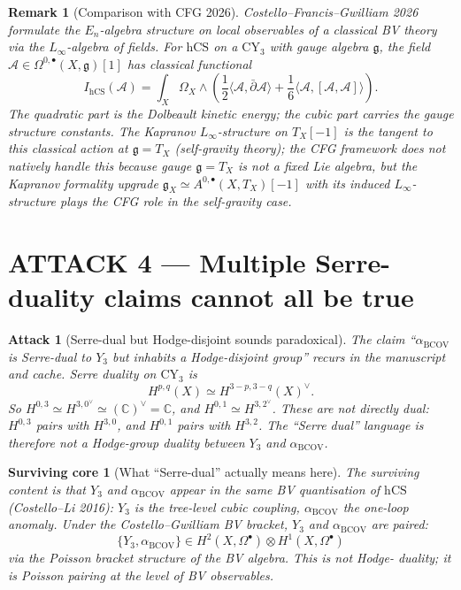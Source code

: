 \documentclass[11pt]{article}
\newtheorem{remark}[theorem]{Remark}
\newtheorem{attack}[theorem]{Attack}
\newtheorem{surviving}[theorem]{Surviving core}
\providecommand{\CY}{\mathrm{CY}}
\providecommand{\BCOV}{\mathrm{BCOV}}
\providecommand{\hCS}{\mathrm{hCS}}
\providecommand{\Om}{\Omega}
\providecommand{\cA}{\mathcal{A}}
\providecommand{\fg}{\mathfrak{g}}
\providecommand{\CC}{\mathbb{C}}
\begin{document}
\begin{remark}[Comparison with CFG 2026]
\label{rem:cfg-comparison-3}
Costello--Francis--Gwilliam 2026 formulate the $E_n$-algebra structure
on local observables of a classical BV theory via the $L_\infty$-algebra
of fields. For $\hCS$ on a $\CY_3$ with gauge algebra $\fg$, the field
$\mathcal A \in \Om^{0,\bullet}(X, \fg)[1]$ has classical functional
\[
  I_\hCS(\cA) = \int_X \Om_X \wedge \left(\frac{1}{2} \langle \cA,
    \bar\partial \cA \rangle + \frac{1}{6} \langle \cA, [\cA, \cA]
    \rangle\right).
\]
The quadratic part is the Dolbeault kinetic energy; the cubic part
carries the gauge structure constants. The Kapranov $L_\infty$-structure
on $T_X[-1]$ is the \emph{tangent} to this classical action at $\fg =
T_X$ (self-gravity theory); the CFG framework does not natively handle
this because gauge $\fg = T_X$ is not a fixed Lie algebra, but the
Kapranov formality upgrade $\mathfrak g_X \simeq A^{0,\bullet}(X, T_X)[-1]$
with its induced $L_\infty$-structure plays the CFG role in the
self-gravity case.
\end{remark}

\section{ATTACK 4 --- Multiple Serre-duality claims cannot all be true}
\label{sec:attack-4}

\begin{attack}[Serre-dual but Hodge-disjoint sounds paradoxical]
\label{atk:4}
The claim ``$\alpha_\BCOV$ is Serre-dual to $Y_3$ but inhabits a
Hodge-disjoint group'' recurs in the manuscript and cache. Serre duality
on $\CY_3$ is
\[
  H^{p,q}(X) \simeq H^{3-p, 3-q}(X)^\vee.
\]
So $H^{0,3} \simeq H^{3,0 }^\vee \simeq (\CC)^\vee = \CC$, and $H^{0,1}
\simeq H^{3,2}^\vee$. These are \emph{not} directly dual: $H^{0,3}$
pairs with $H^{3,0}$, and $H^{0,1}$ pairs with $H^{3,2}$. The ``Serre
dual'' language is therefore not a Hodge-group duality between $Y_3$ and
$\alpha_\BCOV$.
\end{attack}

\begin{surviving}[What ``Serre-dual'' actually means here]
\label{surv:4}
The surviving content is that $Y_3$ and $\alpha_\BCOV$ appear \emph{in
the same BV quantisation} of $\hCS$ (Costello--Li 2016): $Y_3$ is the
tree-level cubic coupling, $\alpha_\BCOV$ the one-loop anomaly. Under
the Costello--Gwilliam BV bracket, $Y_3$ and $\alpha_\BCOV$ are paired:
\[
  \{Y_3, \alpha_\BCOV\} \in H^2(X, \Om^\bullet) \otimes H^1(X,
    \Om^\bullet)
\]
via the Poisson bracket structure of the BV algebra. This is not Hodge-
duality; it is Poisson pairing at the level of BV observables.
\end{surviving}
\end{document}
